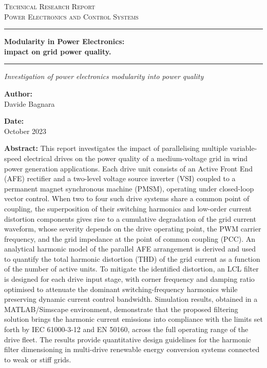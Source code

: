 \documentclass[12pt,a4paper]{scrartcl}
\newcommand{\DocCategory}{Technical Research Report}
\newcommand{\DocField}{Power Electronics and Control Systems}
\newcommand{\DocTitle}{%
	{\fontsize{20}{24}\selectfont\bfseries Modularity in Power Electronics:} \\[16pt]
	{\fontsize{16}{20}\selectfont\bfseries impact on grid power quality.}
}
\newcommand{\DocSubtitle}{%
	Investigation of power electronics modularity into power quality 
}
\newcommand{\DocAuthor}{Davide Bagnara}
\newcommand{\DocDate}{October 2023}
\newcommand{\DocAbstract}{%
	This report investigates the impact of parallelising multiple variable-speed electrical drives on the power quality of a medium-voltage grid in wind power generation applications. Each drive unit consists of an Active Front End (AFE) rectifier and a two-level voltage source inverter (VSI) coupled to a permanent magnet synchronous machine (PMSM), operating under closed-loop vector control. When two to four such drive systems share a common point of coupling, the superposition of their switching harmonics and low-order current distortion components gives rise to a cumulative degradation of the grid current waveform, whose severity depends on the drive operating point, the PWM carrier frequency, and the grid impedance at the point of common coupling (PCC). An analytical harmonic model of the parallel AFE arrangement is derived and used to quantify the total harmonic distortion (THD) of the grid current as a function of the number of active units. To mitigate the identified distortion, an LCL filter is designed for each drive input stage, with corner frequency and damping ratio optimised to attenuate the dominant switching-frequency harmonics while preserving dynamic current control bandwidth. Simulation results, obtained in a MATLAB/Simscape environment, demonstrate that the proposed filtering solution brings the harmonic current emissions into compliance with the limits set forth by IEC 61000-3-12 and EN 50160, across the full operating range of the drive fleet. The results provide quantitative design guidelines for the harmonic filter dimensioning in multi-drive renewable energy conversion systems connected to weak or stiff grids.
}
\begin{document}
	\titlepage
	\begin{center}
		{\Large\scshape \DocCategory}\\[8pt]
		{\large\scshape \DocField}
	\end{center}
	
	\vspace{36pt}
	\noindent\rule{\linewidth}{0.8pt}
	
	\vspace{16pt}
	\begin{center}
		\DocTitle
	\end{center}
	
	\vspace{4pt}
	\noindent\rule{\linewidth}{2.2pt}
	
	\begin{center}
		\begin{onehalfspace}
			{\large\itshape \DocSubtitle}
		\end{onehalfspace}
	\end{center}
	
	\vspace{18pt}
	
	\begin{minipage}{0.92\linewidth}
		\noindent
		\begin{minipage}[t]{0.48\linewidth}
			\textbf{Author:}\\[2pt]
			\DocAuthor
		\end{minipage}%
		\hfill
		\begin{minipage}[t]{0.48\linewidth}
			\raggedleft
			\textbf{Date:}\\[2pt]
			\DocDate
		\end{minipage}
	\end{minipage}
	\vspace{36pt}
	
	\begin{center}
		\begin{minipage}{0.85\linewidth}
			\footnotesize 
			\begin{onehalfspace}
				\textbf{Abstract:} \DocAbstract
			\end{onehalfspace}
		\end{minipage}
	\end{center}
	
\end{document}
